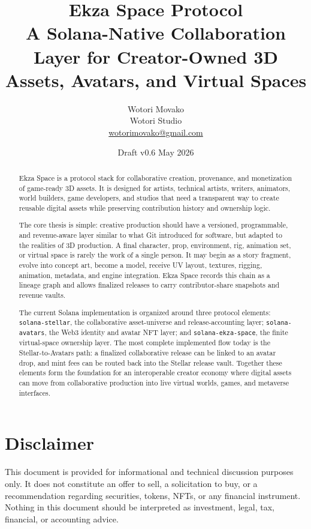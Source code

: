 \documentclass[10pt,twocolumn]{article}
\newcommand{\protocol}[1]{\texttt{#1}}
\begin{document}
\title{\textbf{Ekza Space Protocol}\\\large A Solana-Native Collaboration Layer for Creator-Owned 3D Assets, Avatars, and Virtual Spaces}
\author{Wotori Movako\\Wotori Studio\\\href{mailto:wotorimovako@gmail.com}{wotorimovako@gmail.com}}
\date{Draft v0.6 \quad May 2026}
\maketitle
\thispagestyle{fancy}

\begin{abstract}
Ekza Space is a protocol stack for collaborative creation, provenance, and monetization of game-ready 3D assets. It is designed for artists, technical artists, writers, animators, world builders, game developers, and studios that need a transparent way to create reusable digital assets while preserving contribution history and ownership logic.

The core thesis is simple: creative production should have a versioned, programmable, and revenue-aware layer similar to what Git introduced for software, but adapted to the realities of 3D production. A final character, prop, environment, rig, animation set, or virtual space is rarely the work of a single person. It may begin as a story fragment, evolve into concept art, become a model, receive UV layout, textures, rigging, animation, metadata, and engine integration. Ekza Space records this chain as a lineage graph and allows finalized releases to carry contributor-share snapshots and revenue vaults.

The current Solana implementation is organized around three protocol elements: \protocol{solana-stellar}, the collaborative asset-universe and release-accounting layer; \protocol{solana-avatars}, the Web3 identity and avatar NFT layer; and \protocol{solana-ekza-space}, the finite virtual-space ownership layer. The most complete implemented flow today is the Stellar-to-Avatars path: a finalized collaborative release can be linked to an avatar drop, and mint fees can be routed back into the Stellar release vault. Together these elements form the foundation for an interoperable creator economy where digital assets can move from collaborative production into live virtual worlds, games, and metaverse interfaces.
\end{abstract}

\section{Disclaimer}
This document is provided for informational and technical discussion purposes only. It does not constitute an offer to sell, a solicitation to buy, or a recommendation regarding securities, tokens, NFTs, or any financial instrument. Nothing in this document should be interpreted as investment, legal, tax, financial, or accounting advice.
\end{document}
